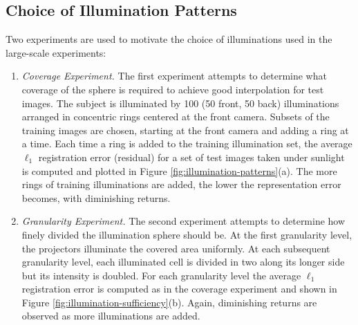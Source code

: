 \subsection{Choice of Illumination Patterns}

Two experiments are used to motivate the choice of illuminations 
used in the large-scale experiments:
\begin{enumerate}
\item {\em Coverage Experiment.} The first experiment 
    attempts to determine what coverage of the sphere is
    required to achieve good interpolation for test images.
    The subject is illuminated by 100 (50 front, 50 back)
    illuminations arranged in concentric rings centered at
    the front camera.  Subsets of the training images are
    chosen, starting at the front camera and adding a ring
    at a time.  Each time a ring is added to the training
    illumination set, the average $\ell_1$ registration
    error (residual) for a set of test images taken under
    sunlight is computed and plotted in Figure
    \ref{fig:illumination-patterns}(a).  The more rings of
    training illuminations are added, the lower the
    representation error becomes, with diminishing returns.
\item {\em Granularity Experiment.} The second
    experiment attempts to determine how finely divided
    the illumination sphere should be.  At the first
    granularity level, the projectors illuminate the
    covered area uniformly.  At each subsequent granularity
    level, each illuminated cell is divided in two along its
    longer side but its intensity is doubled.  For each
    granularity level the average $\ell_1$ registration
    error is computed as in the coverage experiment and
    shown in Figure \ref{fig:illumination-sufficiency}(b).
    Again, diminishing returns are observed as more
    illuminations are added.
\end{enumerate}
